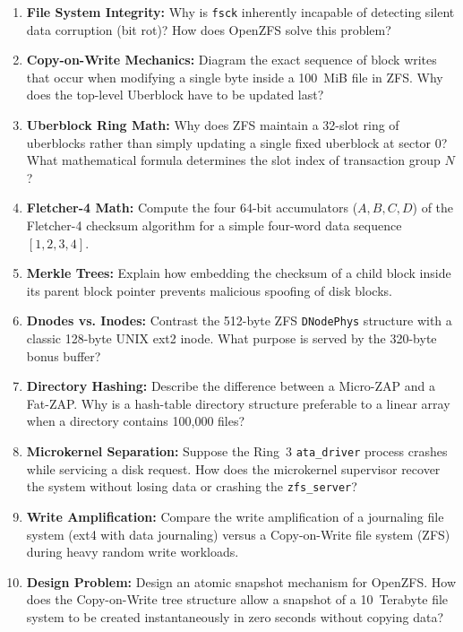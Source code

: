 \begin{enumerate}
    \item \textbf{File System Integrity:} Why is \texttt{fsck} inherently incapable of detecting silent data corruption (bit rot)? How does OpenZFS solve this problem?
    \item \textbf{Copy-on-Write Mechanics:} Diagram the exact sequence of block writes that occur when modifying a single byte inside a 100~MiB file in ZFS. Why does the top-level Uberblock have to be updated last?
    \item \textbf{Uberblock Ring Math:} Why does ZFS maintain a 32-slot ring of uberblocks rather than simply updating a single fixed uberblock at sector 0? What mathematical formula determines the slot index of transaction group $N$?
    \item \textbf{Fletcher-4 Math:} Compute the four 64-bit accumulators ($A, B, C, D$) of the Fletcher-4 checksum algorithm for a simple four-word data sequence $[1, 2, 3, 4]$.
    \item \textbf{Merkle Trees:} Explain how embedding the checksum of a child block inside its parent block pointer prevents malicious spoofing of disk blocks.
    \item \textbf{Dnodes vs. Inodes:} Contrast the 512-byte ZFS \texttt{DNodePhys} structure with a classic 128-byte UNIX ext2 inode. What purpose is served by the 320-byte bonus buffer?
    \item \textbf{Directory Hashing:} Describe the difference between a Micro-ZAP and a Fat-ZAP. Why is a hash-table directory structure preferable to a linear array when a directory contains 100,000 files?
    \item \textbf{Microkernel Separation:} Suppose the Ring~3 \texttt{ata\_driver} process crashes while servicing a disk request. How does the microkernel supervisor recover the system without losing data or crashing the \texttt{zfs\_server}?
    \item \textbf{Write Amplification:} Compare the write amplification of a journaling file system (ext4 with data journaling) versus a Copy-on-Write file system (ZFS) during heavy random write workloads.
    \item \textbf{Design Problem:} Design an atomic snapshot mechanism for OpenZFS. How does the Copy-on-Write tree structure allow a snapshot of a 10~Terabyte file system to be created instantaneously in zero seconds without copying data?
\end{enumerate}
